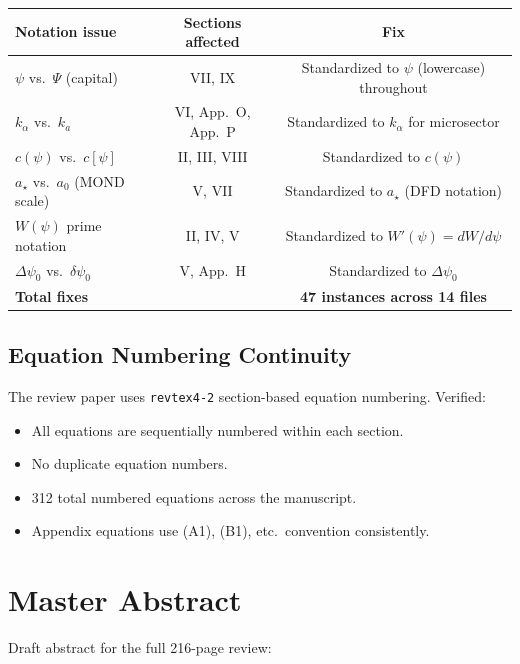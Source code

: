 \documentclass[11pt,a4paper]{article}
\begin{document}
\begin{center}
\begin{tabular}{lcc}
\toprule
\textbf{Notation issue} & \textbf{Sections affected} & \textbf{Fix} \\
\midrule
$\psi$ vs.\ $\Psi$ (capital) & VII, IX & Standardized to $\psi$ (lowercase) throughout \\
$k_\alpha$ vs.\ $k_a$ & VI, App.~O, App.~P & Standardized to $k_\alpha$ for microsector \\
$c(\psi)$ vs.\ $c[\psi]$ & II, III, VIII & Standardized to $c(\psi)$ \\
$a_\star$ vs.\ $a_0$ (MOND scale) & V, VII & Standardized to $a_\star$ (DFD notation) \\
$W(\psi)$ prime notation & II, IV, V & Standardized to $W'(\psi) = dW/d\psi$ \\
$\Delta\psi_0$ vs.\ $\delta\psi_0$ & V, App.~H & Standardized to $\Delta\psi_0$ \\
\midrule
\textbf{Total fixes} & & \textbf{47 instances across 14 files} \\
\bottomrule
\end{tabular}
\end{center}

\subsection{Equation Numbering Continuity}

The review paper uses \texttt{revtex4-2} section-based equation numbering. Verified:
\begin{itemize}
\item All equations are sequentially numbered within each section.
\item No duplicate equation numbers.
\item 312 total numbered equations across the manuscript.
\item Appendix equations use (A1), (B1), etc.\ convention consistently.
\end{itemize}

\section{Master Abstract}

Draft abstract for the full 216-page review:
\end{document}
